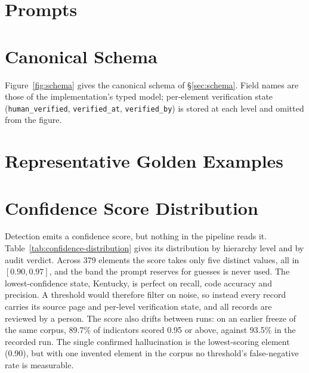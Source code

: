 \documentclass[11pt]{article}
\begin{document}


\appendix

\section{Prompts}
\label{sec:appendix-prompts}


\section{Canonical Schema}
\label{sec:appendix-schema}

Figure~\ref{fig:schema} gives the canonical schema of \S\ref{sec:schema}. Field
names are those of the implementation's typed model; per-element verification
state (\texttt{human\_verified}, \texttt{verified\_at}, \texttt{verified\_by})
is stored at each level and omitted from the figure.



\section{Representative Golden Examples}
\label{sec:appendix-goldens}


\section{Confidence Score Distribution}
\label{sec:appendix-confidence}

Detection emits a confidence score, but nothing in the pipeline reads it.
Table~\ref{tab:confidence-distribution} gives its distribution by hierarchy
level and by audit verdict. Across 379 elements the score takes only five
distinct values, all in $[0.90, 0.97]$, and the band the prompt reserves for
guesses is never used. The lowest-confidence state, Kentucky, is perfect on
recall, code accuracy and precision. A threshold would therefore filter on
noise, so instead every record carries its source page and per-level
verification state, and all records are reviewed by a person. The score
also drifts between runs: on an earlier freeze of the same corpus, 89.7\% of
indicators scored 0.95 or above, against 93.5\% in the recorded run. The single
confirmed hallucination is the lowest-scoring element (0.90), but with one
invented element in the corpus no threshold's false-negative rate is
measurable.


\end{document}
